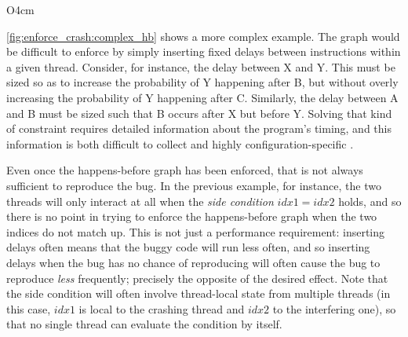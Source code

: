 \begin{wrapfigure}{O}{4cm}
  \vspace{-12pt}
  \vspace{-12pt}
\end{wrapfigure}
\autoref{fig:enforce_crash:complex_hb} shows a more complex
example.  The graph would be difficult to enforce by simply inserting
fixed delays between instructions within a given thread.  Consider,
for instance, the delay between X and Y.  This must be sized so as to
increase the probability of Y happening after B, but without overly
increasing the probability of Y happening
after C.  Similarly, the delay between A and B must be sized such that
B occurs after X but before Y.  Solving that kind of constraint
requires detailed information about the program's timing, and this
information is both difficult to collect and highly
configuration-specific .

Even once the happens-before graph has been enforced, that is not
always sufficient to reproduce the bug.  In the previous example, for
instance, the two threads will only interact at all when the
\emph{side condition} $\mathit{idx1} = \mathit{idx2}$ holds, and so
there is no point in trying to enforce the happens-before graph when
the two indices do not match up.  This is not just a performance
requirement: inserting delays often means that the buggy code will run
less often, and so inserting delays when the bug has no chance of
reproducing will often cause the bug to reproduce \emph{less}
frequently; precisely the opposite of the desired effect.  Note that
the side condition will often involve thread-local state from multiple
threads (in this case, $\mathit{idx1}$ is local to the crashing thread
and $\mathit{idx2}$ to the interfering one), so that no single thread
can evaluate the condition by itself.

